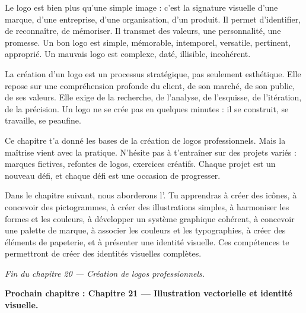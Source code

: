 Le logo est bien plus qu'une simple image : c'est la signature visuelle d'une marque, d'une entreprise, d'une organisation, d'un produit. Il permet d'identifier, de reconnaître, de mémoriser. Il transmet des valeurs, une personnalité, une promesse. Un bon logo est simple, mémorable, intemporel, versatile, pertinent, approprié. Un mauvais logo est complexe, daté, illisible, incohérent.

La création d'un logo est un processus stratégique, pas seulement esthétique. Elle repose sur une compréhension profonde du client, de son marché, de son public, de ses valeurs. Elle exige de la recherche, de l'analyse, de l'esquisse, de l'itération, de la précision. Un logo ne se crée pas en quelques minutes : il se construit, se travaille, se peaufine.

Ce chapitre t'a donné les bases de la création de logos professionnels. Mais la maîtrise vient avec la pratique. N'hésite pas à t'entraîner sur des projets variés : marques fictives, refontes de logos, exercices créatifs. Chaque projet est un nouveau défi, et chaque défi est une occasion de progresser.

Dans le chapitre suivant, nous aborderons l'. Tu apprendras à créer des icônes, à concevoir des pictogrammes, à créer des illustrations simples, à harmoniser les formes et les couleurs, à développer un système graphique cohérent, à concevoir une palette de marque, à associer les couleurs et les typographies, à créer des éléments de papeterie, et à présenter une identité visuelle. Ces compétences te permettront de créer des identités visuelles complètes.

\vspace{2em}

\begin{center}
\textit{Fin du chapitre 20 --- Création de logos professionnels.}

\vspace{1em}

\textbf{Prochain chapitre : Chapitre 21 --- Illustration vectorielle et identité visuelle.}
\end{center}